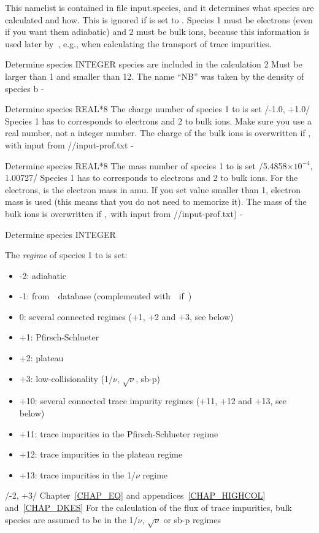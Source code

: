 This namelist is contained in file {\ttfamily input.species}, and it determines what species are calculated and how. This is ignored if  is set to \true. Species 1 must be electrons (even if you want them adiabatic) and 2 must be bulk ions, because this information is used later by~\KNOSOS, e.g., when calculating the transport of trace impurities. 
 

{Determine species}
{INTEGER}
{ species are included in the calculation}
{2}%
{Must be larger than 1 and smaller than 12. The name ``NB'' was taken by the density of species b}
{-}

{Determine species}
{REAL*8}
{The charge number of species 1 to  is set}
{/-1.0, +1.0/}%
{Species 1 has to corresponds to electrons and 2 to bulk ions. Make sure you use a real number, not a integer number. The charge of the bulk ions is overwritten if , with input from {\ttfamily //input-prof.txt}}
{-}

{Determine species}
{REAL*8}
{The mass number of species 1 to  is set}
{/5.4858$\times 10^{-4}$, 1.00727/}%
{Species 1 has to corresponds to electrons and 2 to bulk ions. For the electrons,  is the electron mass in amu. If you set  value smaller than 1, electron mass is used (this means that you do not need to memorize it). The mass of the bulk ions is overwritten if ,~with input from {\ttfamily //input-prof.txt})}
{-}

{Determine species}
{INTEGER}
{The \textit{regime} of species 1 to  is set:
\begin{itemize}
\item  -2: adiabatic
\item  -1: from~\DKES~database (complemented with~\KNOSOS~if~)
\item   0: several connected regimes (+1, +2 and +3, see below)
\item  +1: Pfirsch-Schlueter
\item  +2: plateau
\item  +3: low-collisionality (1/$\nu$, $\sqrt{\nu}$, sb-p)
\item +10: several connected trace impurity regimes (+11, +12 and +13, see below)
\item +11: trace impurities in the Pfirsch-Schlueter regime
\item +12: trace impurities in the plateau regime
\item +13: trace impurities in the 1/$\nu$ regime
\end{itemize}}
{/-2, +3/}
{Chapter~\ref{CHAP_EQ} and appendices~\ref{CHAP_HIGHCOL} and~\ref{CHAP_DKES}} 
{For the calculation of the flux of  trace impurities, bulk species are assumed to be in the 1/$\nu$, $\sqrt{\nu}$ or sb-p regimes}

